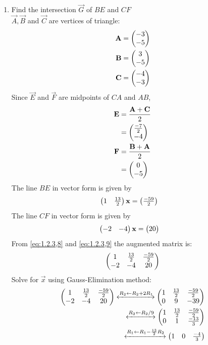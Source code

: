\documentclass[11pt]{book}
\begin{document}
\begin{enumerate}[label=\thesection.\arabic*.,ref=\thesection.\theenumi]
\item Find the intersection $\vec{G}$ of $BE$ and $CF$
\\ 
\solution 
$\vec{A},\vec{B}$ and $\vec{C}$ are vertices of triangle:
\begin{align}
    \mathbf{A} &= \begin{pmatrix}-3 \\-5\end{pmatrix} \\
    \mathbf{B} &= \begin{pmatrix}3 \\ -5\end{pmatrix} \\
    \mathbf{C} &= \begin{pmatrix}-4 \\-3\end{pmatrix}
\end{align}
Since $\vec{E}$ and $\vec{F}$ are midpoints of $CA$ and $AB$,
\begin{align}
    \mathbf{E} &= \frac{\mathbf{A} + \mathbf{C}}{2} \\
	&= \begin{pmatrix}\frac{-7}{2} \\-4\end{pmatrix}\\
    \mathbf{F} &= \frac{\mathbf{B} + \mathbf{A}}{2} \\ 
    &= \begin{pmatrix} 0 \\ -5\end{pmatrix}
\end{align}
The line $BE$ in vector form is given by
\begin{align}
\myvec{1 & \frac{13}{2}} \vec{x} &= \myvec{\frac{-59}{2}}
\label{eq:1.2.3,8}
\end{align}
The line $CF$ in vector form is given by
\begin{align}
\myvec{ -2&-4} \vec{x} &= \myvec{20}
\label{eq:1.2.3,9}
\end{align}
From \eqref{eq:1.2.3,8} and \eqref{eq:1.2.3,9} the augmented matrix is:
\begin{align}
\begin{pmatrix}
1 & \frac{13}{2} & \frac{-59}{2} \\
-2 & -4 & 20
\end{pmatrix}
\end{align}
Solve for $\vec{x}$ using Gauss-Elimination method:
\begin{align}
    \label{eq:matrowoperations}
 \myvec{
1 & \frac{13}{2} & \frac{-59}{2} \\
-2 & -4 & 20
}
\xleftrightarrow[]{R_2 \leftarrow R_2+2R_1}
    \myvec{
    1 & \frac{13}{2} & \frac{-59}{2}
    \\
    0 & 9 & -39 
    }
    \\
     \xleftrightarrow[]{R_2\leftarrow R_2/9}
    \myvec{
    1 & \frac{13}{2} & \frac{-59}{2}
    \\
    0 & 1 & \frac{-13}{3} 
    }
    \\
     \xleftrightarrow[]{R_1\leftarrow R_1-\frac{13}{2}R_2}
    \myvec{
    1 & 0 & \frac{-4}{3}
}
\end{align}
\end{enumerate}
\end{document}
